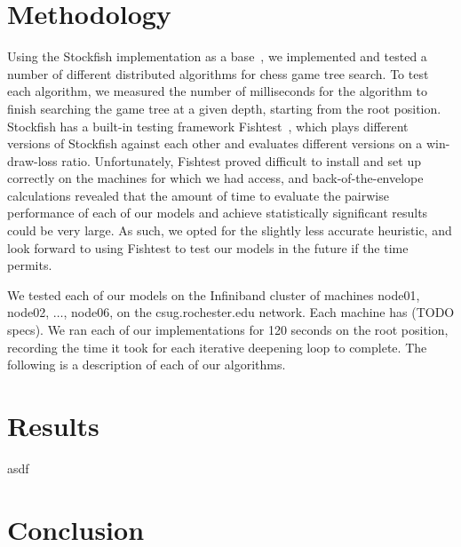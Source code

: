 \documentclass{article}
\begin{document}
\section{Methodology} \label{Algorithms}
Using the Stockfish implementation as a base~\cite{stockfish:code}, we implemented and tested a number
of different distributed algorithms for chess game tree search. To test each
algorithm, we measured the number of milliseconds for the algorithm to finish
searching the game tree at a given depth, starting from the root position.
Stockfish has a built-in testing framework Fishtest~\cite{fishtest},
which plays different versions of Stockfish against each other and evaluates
different versions on a win-draw-loss ratio. Unfortunately, Fishtest proved
difficult to install and set up correctly on the machines for which we had
access, and back-of-the-envelope calculations revealed that the amount of time
to evaluate the pairwise performance of each of our models and achieve
statistically significant results could be very large. As such, we opted for the
slightly less accurate heuristic, and look forward to using Fishtest to test our
models in the future if the time permits.

We tested each of our models on the Infiniband cluster of machines
node01, node02, $\hdots$, node06, on the csug.rochester.edu network.
Each machine has (TODO specs). We ran each of our implementations for 120
seconds on the root position, recording the time it took for each iterative
deepening loop to complete. The following is a description of each of our
algorithms.

\section{Results} \label{Results}
asdf

\section{Conclusion}


\pagebreak
\pagestyle{empty}



\end{document}
